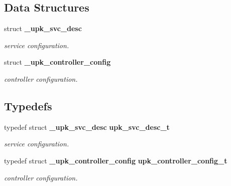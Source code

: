 \subsection*{Data Structures}
\begin{DoxyCompactItemize}
\item 
struct {\bf \_\-upk\_\-svc\_\-desc}
\begin{DoxyCompactList}\small\item\em service configuration. \end{DoxyCompactList}\item 
struct {\bf \_\-upk\_\-controller\_\-config}
\begin{DoxyCompactList}\small\item\em controller configuration. \end{DoxyCompactList}\end{DoxyCompactItemize}
\subsection*{Typedefs}
\begin{DoxyCompactItemize}
\item 
typedef struct {\bf \_\-upk\_\-svc\_\-desc} {\bf upk\_\-svc\_\-desc\_\-t}
\begin{DoxyCompactList}\small\item\em service configuration. \end{DoxyCompactList}\item 
typedef struct {\bf \_\-upk\_\-controller\_\-config} {\bf upk\_\-controller\_\-config\_\-t}
\begin{DoxyCompactList}\small\item\em controller configuration. \end{DoxyCompactList}\end{DoxyCompactItemize}
